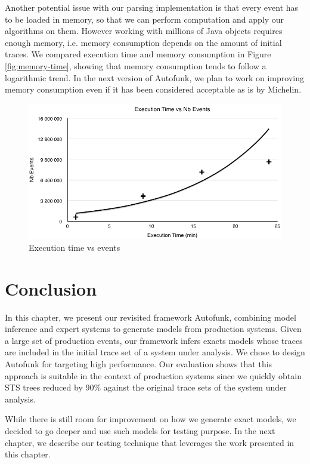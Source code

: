 Another potential issue with our parsing implementation is that
every event has to be loaded in memory, so that we can perform
computation and apply our algorithms on them. However working
with millions of Java objects requires enough memory, i.e.
memory consumption depends on the amount of initial traces. We
compared execution time and memory consumption in Figure
\ref{fig:memory-time}, showing that memory consumption tends to
follow a logarithmic trend. In the next version of Autofunk, we
plan to work on improving memory consumption even if it has been
considered acceptable as is by Michelin.

\begin{figure}[ht]
  \includegraphics[width=0.9\linewidth]{figures/time-vs-messages.png}

  \caption{Execution time vs events}
  \label{fig:time-vs-messages}
\end{figure}


\section{Conclusion}
\label{sec:modelinf:prodsystems:conclusion}

In this chapter, we present our revisited framework Autofunk,
combining model inference and expert systems to generate models
from production systems. Given a large set of production events,
our framework infers exacts models whose traces are included in
the initial trace set of a system under analysis. We chose to
design Autofunk for targeting high performance. Our evaluation
shows that this approach is suitable in the context of production
systems since we quickly obtain STS trees reduced by 90\% against
the original trace sets of the system under analysis.

While there is still room for improvement on how we generate
exact models, we decided to go deeper and use such models for
testing purpose. In the next chapter, we describe our testing
technique that leverages the work presented in this chapter.
